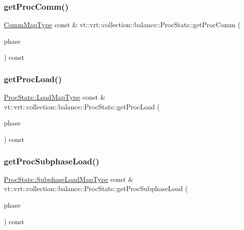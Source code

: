 \subsubsection{\texorpdfstring{get\+Proc\+Comm()}{getProcComm()}}
{\footnotesize\ttfamily \hyperlink{namespacevt_1_1vrt_1_1collection_1_1balance_aa50d4cbbfa3c643e7303fc6e08f411fb}{Comm\+Map\+Type} const  \& vt\+::vrt\+::collection\+::balance\+::\+Proc\+Stats\+::get\+Proc\+Comm (\begin{DoxyParamCaption}\item[{\hyperlink{namespacevt_a46ce6733d5cdbd735d561b7b4029f6d7}{Phase\+Type}}]{phase }\end{DoxyParamCaption}) const}

\mbox{\label{structvt_1_1vrt_1_1collection_1_1balance_1_1_proc_stats_a58efd15cd33db3c5ce9ba8677feb486b}} 
\subsubsection{\texorpdfstring{get\+Proc\+Load()}{getProcLoad()}}
{\footnotesize\ttfamily \hyperlink{structvt_1_1vrt_1_1collection_1_1balance_1_1_proc_stats_aa810fd21680061ec5d50f6526f66be31}{Proc\+Stats\+::\+Load\+Map\+Type} const  \& vt\+::vrt\+::collection\+::balance\+::\+Proc\+Stats\+::get\+Proc\+Load (\begin{DoxyParamCaption}\item[{\hyperlink{namespacevt_a46ce6733d5cdbd735d561b7b4029f6d7}{Phase\+Type}}]{phase }\end{DoxyParamCaption}) const}

\mbox{\label{structvt_1_1vrt_1_1collection_1_1balance_1_1_proc_stats_a56fe200ac4575869c60a02cfd628151d}} 
\subsubsection{\texorpdfstring{get\+Proc\+Subphase\+Load()}{getProcSubphaseLoad()}}
{\footnotesize\ttfamily \hyperlink{structvt_1_1vrt_1_1collection_1_1balance_1_1_proc_stats_ab2312e47e475143cf295d45cb2493f48}{Proc\+Stats\+::\+Subphase\+Load\+Map\+Type} const  \& vt\+::vrt\+::collection\+::balance\+::\+Proc\+Stats\+::get\+Proc\+Subphase\+Load (\begin{DoxyParamCaption}\item[{\hyperlink{namespacevt_a46ce6733d5cdbd735d561b7b4029f6d7}{Phase\+Type}}]{phase }\end{DoxyParamCaption}) const}

